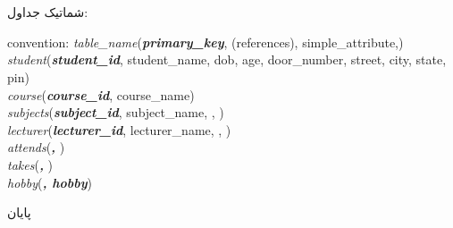 \documentclass[a4paper]{article}
\newcommand{\goodby}{\begin{center}{\huge
پایان
}\end{center}}
\begin{document}
\section{}

شماتیک جداول:
\begin{latin}
  \noindent
  {\Large convention: }\textit{table\_name}(\emph{\textbf{primary\_key}}, (references), simple\_attribute,) \\[1cm]
  \noindent
  \textit{student}(\emph{\textbf{student\_id}}, student\_name, dob, age, door\_number, street, city, state, pin) \\
  \textit{course}(\emph{\textbf{course\_id}}, course\_name) \\
  \textit{subjects}(\emph{\textbf{subject\_id}}, subject\_name, , ) \\
  \textit{lecturer}(\emph{\textbf{lecturer\_id}}, lecturer\_name, , ) \\
  \textit{attends}(\emph{\textbf{, }}) \\
  \textit{takes}(\emph{\textbf{, }}) \\
  \textit{hobby}(\emph{\textbf{, hobby}})
\end{latin}

\newpage
\goodby
\end{document}
